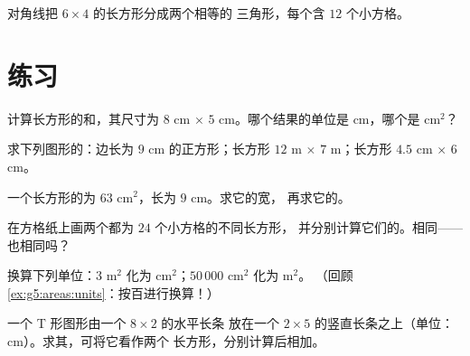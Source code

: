 \begin{omfigure}

{\small 对角线把 $6 \times 4$ 的长方形分成两个相等的
三角形，每个含 $12$ 个小方格。}
\end{omfigure}

\section{练习}

\begin{exercise}[$\star$]\label{exo:g5:areas:1}
计算长方形的和，其尺寸为 $8$ cm $\times$
$5$ cm。哪个结果的单位是 cm，哪个是 cm$^2$？
\end{exercise}

\begin{exercise}[$\star$]\label{exo:g5:areas:2}
求下列图形的：边长为 $9$ cm 的正方形；长方形
$12$ m $\times$ $7$ m；长方形 $4.5$ cm $\times$ $6$ cm。
\end{exercise}

\begin{exercise}[$\star$]\label{exo:g5:areas:3}
一个长方形的为 $63$ cm$^2$，长为 $9$ cm。求它的宽，
再求它的。
\end{exercise}

\begin{exercise}[$\star$]\label{exo:g5:areas:4}
在方格纸上画两个都为 $24$ 个小方格的不同长方形，
并分别计算它们的。相同——也相同吗？
\end{exercise}

\begin{exercise}[$\star$]\label{exo:g5:areas:5}
换算下列单位：$3$ m$^2$ 化为 cm$^2$；\quad $50\,000$ cm$^2$ 化为 m$^2$。
（回顾 \cref{ex:g5:areas:units}：按百进行换算！）
\end{exercise}

\begin{exercise}[$\star$]\label{exo:g5:areas:6}
一个 T 形图形由一个 $8 \times 2$ 的水平长条
放在一个 $2 \times 5$ 的竖直长条之上（单位：cm）。求其，可将它看作两个
长方形，分别计算后相加。
\end{exercise}

